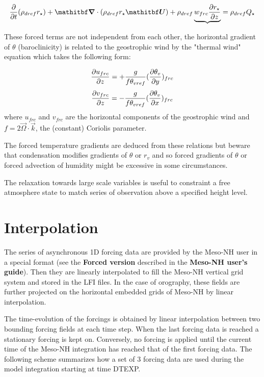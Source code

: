 \begin{equation}
{\partial \over \partial t}(\rho_{dref} r_\star) + \vec \nabla \cdot
(\rho_{dref} r_\star \vec U)+ \rho_{dref}
\underbrace{w_{frc} \dfrac{\partial r_\star }{\partial z}} = \rho_{dref} Q_\star
\end{equation}

\bigskip
These forced terms are not independent from each other, the horizontal
gradient of $\theta$ (baroclinicity) is related to the geostrophic wind by
the "thermal wind" equation which takes the following form:

\begin{equation}
\dfrac{\partial u_{frc}}{\partial z} = + {g \over f \theta_{vref}} (\dfrac{\partial \theta_v}
{\partial y} )_{frc}
\end{equation}
\begin{equation}
\dfrac{\partial v_{frc}}{\partial z} = - {g \over f \theta_{vref}} (\dfrac{\partial \theta_v}
{\partial x} )_{frc}
\end{equation}
where $u_{frc}$ and $v_{frc}$ are the horizontal components of the geostrophic
wind and $f = 2 \vec \Omega \cdot \vec k$, the (constant) Coriolis parameter.

The forced temperature gradients are deduced from these relations but beware
that condensation modifies gradients of $\theta$ or $r_{v}$ and so forced
gradients of $\theta$ or forced advection of humidity might be excessive in
some circumstances.

The relaxation towards large scale variables is useful to constraint a free
atmosphere state to match series of observation above a specified height level.

\section{Interpolation}
The series of asynchronous 1D forcing data are provided by the Meso-NH user
in a special format (see the {\bf Forced version} described in the
{\bf Meso-NH user's guide}).
Then they are linearly interpolated to fill the Meso-NH vertical grid system
and stored in the LFI files.
In the case of orography, these fields are further projected on the horizontal
embedded grids of Meso-NH by linear interpolation.

The time-evolution of the forcings is obtained by linear interpolation between
two bounding forcing fields at each time step. When the last forcing data is
reached a stationary forcing is kept on. Conversely, no forcing is applied
until the current time of the Meso-NH integration has reached that of the first
forcing data. The following scheme summarizes how a set of 3 forcing data are
used during the model integration starting at time DTEXP.

